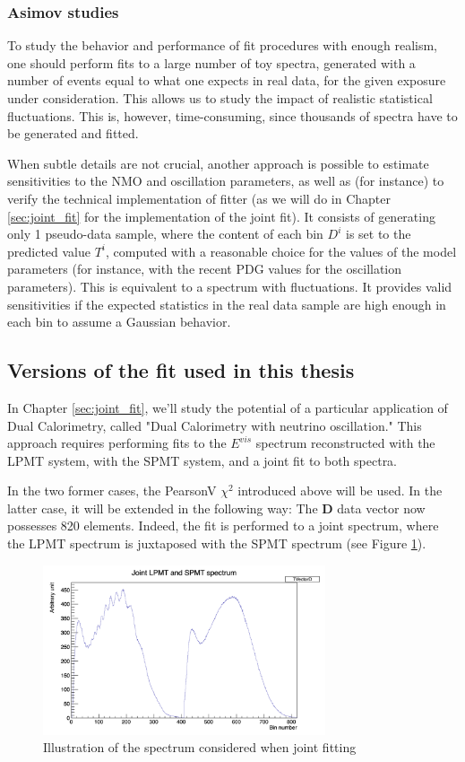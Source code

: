 \documentclass[../main.tex]{subfiles}
\begin{document}
\subsubsection{Asimov studies}
\label{sec:juno:Fit:asimov}

To study the behavior and performance of fit procedures with enough realism, one should perform fits to a large number of toy spectra, generated with a number of events equal to what one expects in real data, for the given exposure under consideration. This allows us to study the impact of realistic statistical fluctuations. This is, however, time-consuming, since thousands of spectra have to be generated and fitted.

When subtle details are not crucial, another approach is possible to estimate sensitivities to the NMO and oscillation parameters, as well as (for instance) to verify the technical implementation of fitter (as we will do in Chapter \ref{sec:joint_fit} for the implementation of the joint fit). It consists of generating only 1 pseudo-data sample, where the content of each bin $D^i$ is set to the predicted value $T^i$, computed with a reasonable choice for the values of the model parameters (for instance, with the recent PDG values for the oscillation parameters). This is equivalent to a spectrum with fluctuations. It provides valid sensitivities if the expected statistics in the real data sample are high enough in each bin to assume a Gaussian behavior.

\subsection{Versions of the fit used in this thesis}

In Chapter \ref{sec:joint_fit}, we'll study the potential of a particular application of Dual Calorimetry, called "Dual Calorimetry with neutrino oscillation." This approach requires performing fits to the $E^{vis}$ spectrum reconstructed with the LPMT system, with the SPMT system, and a joint fit to both spectra.

In the two former cases, the PearsonV $\chi^2$ introduced above will be used. In the latter case, it will be extended in the following way: The $\bm{D}$ data vector now possesses 820 elements. Indeed, the fit is performed to a joint spectrum, where the LPMT spectrum is juxtaposed with the SPMT spectrum (see Figure \ref{fig:juno:joint_fit_spec}).

\begin{figure}[ht]
  \centering
  \includegraphics[height=5cm]{images/juno/joint_fit.png}
  \caption{Illustration of the spectrum considered when joint fitting}
  \label{fig:juno:joint_fit_spec}
\end{figure}
\end{document}
